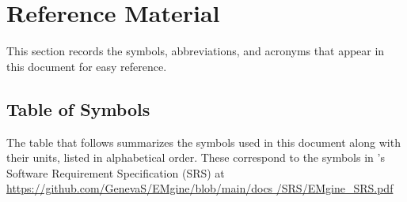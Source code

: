 \section{Reference Material}

This section records the symbols, abbreviations, and acronyms that appear in
this document for easy reference.

\subsection*{Table of Symbols}

The table that follows summarizes the symbols used in this document along with
their units, listed in alphabetical order. These correspond to the symbols in
\progname{}'s Software Requirement Specification (SRS) at
\href{https://github.com/GenevaS/EMgine/blob/main/docs/SRS/EMgine_SRS.pdf}{https://github.com/GenevaS/EMgine/blob/main/docs\newline
    /SRS/EMgine\_SRS.pdf}

